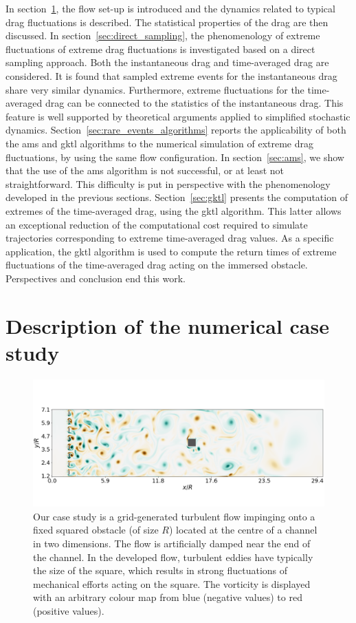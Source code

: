 \documentclass{jfm}
\begin{document}
In section~\ref{sec:test_flow}, the flow set-up is introduced and the dynamics related to typical
drag fluctuations is described.
The statistical properties of the drag are then discussed.
In section~\ref{sec:direct_sampling}, the phenomenology of extreme fluctuations of extreme
drag fluctuations is investigated based on a direct sampling approach.
Both the instantaneous drag and time-averaged drag are considered.
It is found that sampled extreme events for the instantaneous drag share very similar dynamics. Furthermore, extreme fluctuations for the time-averaged drag can be connected to the statistics of the instantaneous drag.
This feature is well supported by theoretical arguments applied to simplified stochastic dynamics.
Section~\ref{sec:rare_events_algorithms} reports the applicability of both the \ac{ams} and \ac{gktl} algorithms to the numerical simulation of extreme drag fluctuations, by using the same flow configuration.
In section~\ref{sec:ams}, we show that the use of the \ac{ams} algorithm is not successful, or at least not straightforward. This difficulty is put in perspective with the phenomenology developed in the previous sections.
Section~\ref{sec:gktl} presents the computation of extremes of the time-averaged drag, using the \ac{gktl} algorithm.
This latter allows an exceptional reduction of the computational cost required to simulate trajectories corresponding to extreme time-averaged drag values.
As a specific application, the \ac{gktl} algorithm is used to compute the return times of extreme fluctuations of the time-averaged drag acting on the immersed obstacle.
Perspectives and conclusion end this work.
	
\section{Description of the numerical case study}
\label{sec:test_flow}
	
\begin{figure}
\centering
\includegraphics[width=\linewidth]{illustr_ecoulement/illustr_ecoulement}
\caption{Our case study is a grid-generated turbulent flow impinging onto a fixed squared obstacle (of size $R$) located at the centre of a channel in two dimensions. The flow is artificially damped near the end of the channel. In the developed flow, turbulent eddies have typically the size of the square, which results in strong fluctuations of mechanical efforts acting on the square. The vorticity is displayed with an arbitrary colour map from blue (negative values) to red (positive values).}
\label{fig:illustr_ecoulement}
\end{figure}
	
\end{document}
